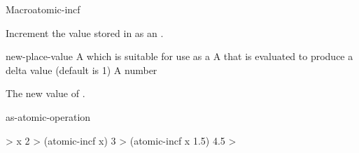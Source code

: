 \documentclass[10pt,twoside,english,pdftex]{article}
\begin{document}
\begin{functiondoc}{Macro}{atomic-incf}{
    }
%

\fnsyntax \fnpurpose Increment the value stored in  as an
.

\fnpackage {}

\fnmodule {}

\fnargs
\begin{args}{new-place-value}
\arg[place] A  which is suitable for use as a
 A  that is evaluated to produce a delta value
(default is 1)
 A number
\end{args}

\fnreturns The new value of . 

\begin{alsos}{as-atomic-operation}
\end{alsos}

\fnexamples
%
\W\supp
\begin{example}
  > x
  2
  > (atomic-incf x)
  3
  > (atomic-incf x 1.5)
  4.5
  >
\end{example}

\end{functiondoc}

\end{document}
